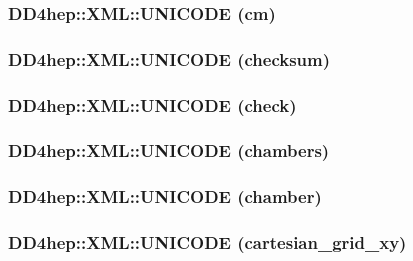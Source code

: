 \label{namespace_d_d4hep_1_1_x_m_l_abcd7b7f159f83d6bc4b58e541fe93e65}
\hypertarget{namespace_d_d4hep_1_1_x_m_l_abcb9f224c739bb6fe5fba75a17bdc7fa}{
\subsubsection[{UNICODE}]{\setlength{\rightskip}{0pt plus 5cm}DD4hep::XML::UNICODE (cm)}}
\label{namespace_d_d4hep_1_1_x_m_l_abcb9f224c739bb6fe5fba75a17bdc7fa}
\hypertarget{namespace_d_d4hep_1_1_x_m_l_ab5dce0c9214c49dd9ca34dcf32ba705b}{
\subsubsection[{UNICODE}]{\setlength{\rightskip}{0pt plus 5cm}DD4hep::XML::UNICODE (checksum)}}
\label{namespace_d_d4hep_1_1_x_m_l_ab5dce0c9214c49dd9ca34dcf32ba705b}
\hypertarget{namespace_d_d4hep_1_1_x_m_l_a7161a93c1987ffc580d2f9f4fb4595a0}{
\subsubsection[{UNICODE}]{\setlength{\rightskip}{0pt plus 5cm}DD4hep::XML::UNICODE (check)}}
\label{namespace_d_d4hep_1_1_x_m_l_a7161a93c1987ffc580d2f9f4fb4595a0}
\hypertarget{namespace_d_d4hep_1_1_x_m_l_a99ab5779948f25c8ee910b070f6ecb23}{
\subsubsection[{UNICODE}]{\setlength{\rightskip}{0pt plus 5cm}DD4hep::XML::UNICODE (chambers)}}
\label{namespace_d_d4hep_1_1_x_m_l_a99ab5779948f25c8ee910b070f6ecb23}
\hypertarget{namespace_d_d4hep_1_1_x_m_l_ab274d20a64d529882b50d0d945f0b805}{
\subsubsection[{UNICODE}]{\setlength{\rightskip}{0pt plus 5cm}DD4hep::XML::UNICODE (chamber)}}
\label{namespace_d_d4hep_1_1_x_m_l_ab274d20a64d529882b50d0d945f0b805}
\hypertarget{namespace_d_d4hep_1_1_x_m_l_a2ec5a989120161c52e0659d9b4e7d9e8}{
\subsubsection[{UNICODE}]{\setlength{\rightskip}{0pt plus 5cm}DD4hep::XML::UNICODE (cartesian\_\-grid\_\-xy)}}
